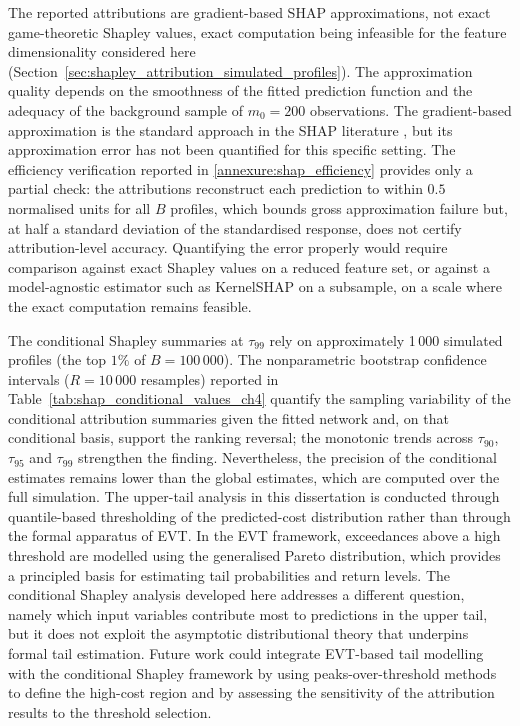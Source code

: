 The reported attributions are gradient-based SHAP approximations, not
exact game-theoretic Shapley values, exact computation being infeasible
for the feature dimensionality considered here
(Section~\ref{sec:shapley_attribution_simulated_profiles}).  The
approximation quality depends on the smoothness of the fitted prediction
function and the adequacy of the background sample of $m_0 = 200$
observations.  The gradient-based
approximation is the standard approach in the SHAP literature
\citep{lundberg2017unified}, but its approximation error has not been
quantified for this specific setting.  The efficiency verification
reported in \ref{annexure:shap_efficiency} provides only a partial check: the
attributions reconstruct each prediction to within $0.5$ normalised units
for all $B$ profiles, which bounds gross approximation failure but, at
half a standard deviation of the standardised response, does not certify
attribution-level accuracy.  Quantifying the error properly would require
comparison against exact Shapley values on a reduced feature set, or
against a model-agnostic estimator such as KernelSHAP on a subsample, on a
scale where the exact computation remains feasible.

The conditional Shapley summaries at $\tau_{99}$ rely on approximately
1\,000 simulated profiles (the top $1\%$ of $B = 100\,000$).  The
nonparametric bootstrap confidence intervals ($R = 10\,000$ resamples)
reported in Table~\ref{tab:shap_conditional_values_ch4} quantify the
sampling variability of the conditional attribution summaries given the
fitted network and, on that conditional basis, support the ranking
reversal; the monotonic trends
across $\tau_{90}$, $\tau_{95}$ and $\tau_{99}$ strengthen the finding.
Nevertheless, the precision of the conditional estimates remains lower
than the global estimates, which are computed over the full simulation.
The upper-tail analysis in this dissertation is
conducted through quantile-based thresholding of the predicted-cost
distribution rather than through the formal apparatus of EVT.  In the EVT framework, exceedances above a high threshold
are modelled using the generalised Pareto distribution, which provides a
principled basis for estimating tail probabilities and return levels.  The
conditional Shapley analysis developed here addresses a different
question, namely which input variables contribute most to predictions in
the upper tail, but it does not exploit the asymptotic distributional
theory that underpins formal tail estimation.  Future work could integrate
EVT-based tail modelling with the conditional Shapley framework by using
peaks-over-threshold methods to define the high-cost region and by
assessing the sensitivity of the attribution results to the threshold
selection.

